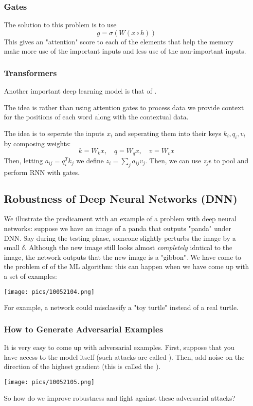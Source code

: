 \documentclass[11pt]{scrartcl}
\begin{document}
\subsubsection{Gates}

The solution to this problem is to use  $$g=\sigma(W(x \circ h))$$
This gives an "attention" score to each of the elements that help the memory make more use of the important inputs and less use of the non-important inputs. 

\subsubsection{Transformers}

Another important deep learning model is that of . 

The idea is rather than using attention gates to process data we provide context for the positions of each word along with the contextual data.

The idea is to seperate the inputs $x_i$ and seperating them into their keys $k_i,q_i,v_i$ by composing weights:
$$k=W_kx, \quad q = W_qx, \quad v = W_vx$$
Then, letting $a_{ij}=q_{i}^{T}k_j$ we define $z_i=\sum_{j}a_{ij}v_{j}$. Then, we can use $z_j$s to pool and perform RNN with gates. 

\subsection{Robustness of Deep Neural Networks (DNN)}
We illustrate the predicament with an example of a problem with deep neural networks: suppose we have an image of a panda that outputs "panda" under DNN. Say during the testing phase, someone slightly perturbs the image by a small $\delta$. Although the new image still looks almost \textit{completely} idntical to the image, the network outputs that the new image is a "gibbon". We have come to the problem of  of the ML algorithm: this can happen when we have come up with a set of  examples:
\begin{center}
    \texttt{[image: pics/10052104.png]}
\end{center}
For example, a network could misclassify a "toy turtle" instead of a real turtle. 

\subsubsection{How to Generate Adversarial Examples}
It is very easy to come up with adversarial examples. First, suppose that you have access to the model itself (such attacks are called ). Then, add noise on the direction of the highest gradient (this is called the ). 
\begin{center}
    \texttt{[image: pics/10052105.png]}
\end{center}
So how do we improve robustness and fight against these adversarial attacks?
\end{document}
